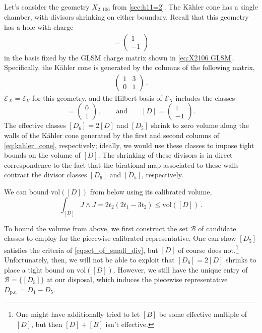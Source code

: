 \documentclass[11pt,dvipsnames]{article}
\theoremstyle{definition}
\begin{document}
Let's consider the geometry $X_{2,106}$ from \cref{sec:h11=2}. The K\"ahler cone has a single chamber, with divisors shrinking on either boundary. Recall that this geometry has a hole with charge
\begin{align}
    [D] = \begin{pmatrix}
        1 \\ -1
    \end{pmatrix}
\end{align}
in the basis fixed by the GLSM charge matrix shown in \cref{eq:X2106 GLSM}. Specifically, the K\"ahler cone is generated by the columns of the following matrix,
\begin{align}
    \label{eq:kahler_cone}
    \begin{pmatrix}
        1 & 3 \\
        0 & 1
    \end{pmatrix}\,.
\end{align}
$\mathcal{E}_X = \mathcal{E}_V$ for this geometry, and the Hilbert basis of $\mathcal{E}_X$ includes the classes
\begin{equation}
    [D_5] = \begin{pmatrix}
        0 \\ 1
    \end{pmatrix}\,,
    \qquad \text{and} \qquad 
    [D] = \begin{pmatrix}
        1 \\ -1
    \end{pmatrix}.
\end{equation}
The effective classes $[D_6] = 2[D]$ and $[D_5]$ shrink to zero volume along the walls of the K\"ahler cone generated by the first and second columns of \cref{eq:kahler_cone}, respectively; ideally, we would use these classes to impose tight bounds on the volume of $[D]$. The shrinking of these divisors is in direct correspondence to the fact that the birational map associated to these walls contract the divisor classes $[D_6]$ and $[D_5]$, respectively.

We can bound $\text{vol}([D])$ from below using its calibrated volume,
\begin{equation}
    \label{eq:h11_2_lower}
    \int_{[D]} J \wedge J = 2t_2(2t_1 - 3t_2) \leq \text{vol}([D])\,.
\end{equation}

To bound the volume from above, we first construct the set $\mathcal{B}$ of candidate classes to employ for the piecewise calibrated representative. One can show $[D_5]$ satisfies the criteria of \cref{eq:set_of_small_div}, but $[D]$ of course does not.\footnote{One might have additionally tried to let $[B]$ be some effective multiple of $[D]$, but then $[D] + [B]$ isn't effective.} Unfortunately, then, we will not be able to exploit that $[D_6] = 2[D]$ shrinks to place a tight bound on $\text{vol}([D])$. However, we still have the unique entry of $\mathcal{B} = \{[D_5]\}$ at our disposal, which induces the piecewise representative $D_{\text{p.c.}} = D_1 - D_5$.
\end{document}
